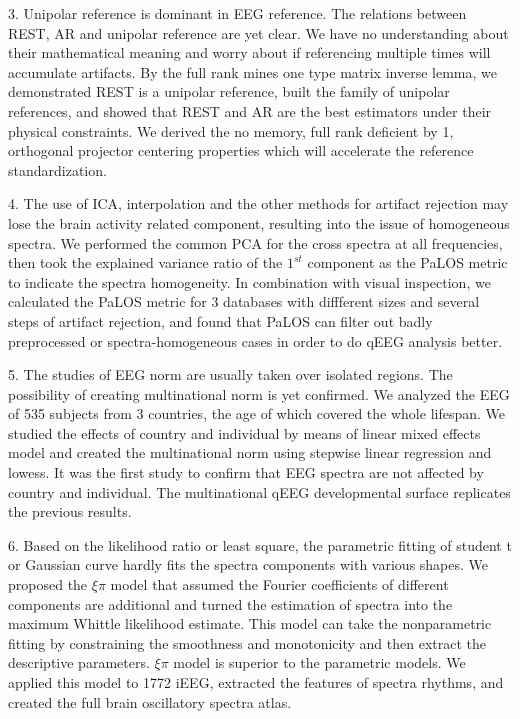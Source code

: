 \begin{englishabstract}
3. Unipolar reference is dominant in EEG reference. The relations between REST, AR and unipolar reference are yet clear. We have no understanding about their mathematical meaning and worry about if referencing multiple times will accumulate artifacts. By the full rank mines one type matrix inverse lemma, we demonstrated REST is a unipolar reference, built the family of unipolar references, and showed that REST and AR are the best estimators under their physical constraints. We derived the no memory, full rank deficient by 1, orthogonal projector centering properties which will accelerate the reference standardization. 

4. The use of ICA, interpolation and the other methods for artifact rejection may lose the brain activity related component, resulting into the issue of homogeneous spectra. We performed the common PCA for the cross spectra at all frequencies, then took the explained variance ratio of the $1^{st}$ component as the PaLOS metric to indicate the spectra homogeneity. In combination with visual inspection, we calculated the PaLOS metric for 3 databases with diffferent sizes and several steps of artifact rejection, and found that PaLOS can filter out
badly preprocessed or spectra-homogeneous cases in order to do qEEG analysis better. 

5. The studies of EEG norm are usually taken over isolated regions. The possibility of creating multinational norm is yet confirmed. We analyzed the EEG of 535 subjects from 3 countries, the age of which covered the whole lifespan. We studied the effects of country and individual by means of linear mixed effects model and created the multinational norm using stepwise linear regression and lowess. It was the first study to confirm that EEG spectra are not affected by country and individual. The multinational qEEG developmental surface replicates the previous results.

6. Based on the likelihood ratio or least square, the parametric fitting of student t or Gaussian curve hardly fits the spectra components with various shapes. We proposed the $\xi\pi$ model that assumed the Fourier coefficients of different components are additional and turned the estimation of spectra into the maximum Whittle likelihood estimate. This model can take the nonparametric fitting by constraining the smoothness and monotonicity and then extract the descriptive parameters. $\xi\pi$ model is superior to the parametric models. We applied this model to 1772 iEEG, extracted the features of spectra rhythms, and created the full brain oscillatory spectra atlas. 


\end{englishabstract}
